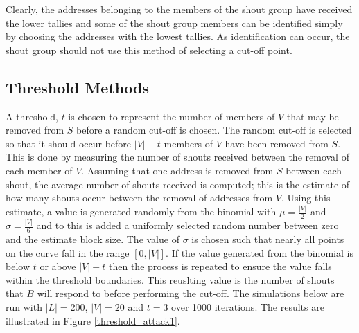 \documentclass[ %
                    author={Luke Murray},
                supervisor={Dr. Simon Hollis},
                     title={Shadow Peer-to-Peer Networks},
                  subtitle={},
                    degree={MEng},
                      year={2013} ]{thesis}
\begin{document}
Clearly, the addresses belonging to the members of the shout group have received the lower tallies and some of the shout group members can be identified simply by choosing the addresses with the lowest tallies. As identification can occur, the shout group should not use this method of selecting a cut-off point.

\subsection{Threshold Methods}

A threshold, $t$ is chosen to represent the number of members of $V$ that may be removed from $S$ before a random cut-off is chosen. The random cut-off is selected so that it should occur before $|V| - t$ members of $V$ have been removed from $S$. This is done by measuring the number of shouts received between the removal of each member of $V$. Assuming that one address is removed from $S$ between each shout, the average number of shouts received is computed; this is the estimate of how many shouts occur between the removal of addresses from $V$. Using this estimate, a value is generated randomly from the binomial with $\mu=\frac{|V|}{2}$ and $\sigma=\frac{|V|}{6}$ and to this is added a uniformly selected random number between zero and the estimate block size. The value of $\sigma$ is chosen such that nearly all points on the curve fall in the range $[0, |V|]$. If the value generated from the binomial is below $t$ or above $|V| - t$ then the process is repeated to ensure the value falls within the threshold boundaries. This reuslting value is the number of shouts that $B$ will respond to before performing the cut-off. The simulations below are run with $|L| = 200$, $|V| = 20$ and $t = 3$ over 1000 iterations. The results are illustrated in Figure \ref{threshold_attack1}.
\end{document}

